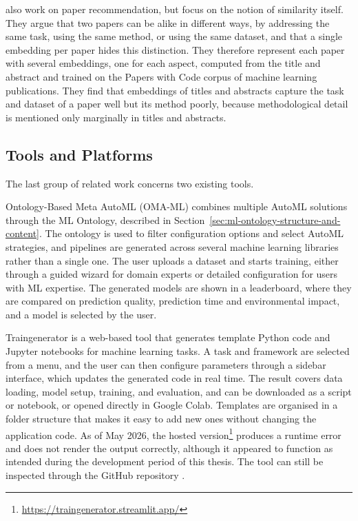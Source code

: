 \textcite{ostendorff2022_aspect_based_embeddings} also work on 
paper recommendation, but focus on the notion of similarity 
itself. They argue that two papers can be alike in different 
ways, by addressing the same task, using the same method, or 
using the same dataset, and that a single embedding per paper 
hides this distinction. They therefore represent each paper 
with several embeddings, one for each aspect, computed from 
the title and abstract and trained on the Papers with Code 
corpus of machine learning publications. They find that 
embeddings of titles and abstracts capture the task and dataset of a 
paper well but its method poorly, because methodological 
detail is mentioned only marginally in titles and abstracts.

\subsection{Tools and Platforms}
\label{sec:tools-and-platforms}

The last group of related work concerns two existing tools.

Ontology-Based Meta AutoML (OMA-ML) \parencite{zender2022ontology_based_meta_automl} combines
multiple AutoML solutions through the ML Ontology, described in
Section~\ref{sec:ml-ontology-structure-and-content}. The ontology
is used to filter configuration options and select AutoML
strategies, and pipelines are generated across several machine
learning libraries rather than a single one. The user uploads a
dataset and starts training, either through a guided wizard for
domain experts or detailed configuration for users with ML
expertise. The generated models are shown in a leaderboard, where
they are compared on prediction quality, prediction time and
environmental impact, and a model is selected by the user.

Traingenerator \parencite{rieke2021traingenerator} is a 
web-based tool that generates template Python code and Jupyter 
notebooks for machine learning tasks. A task and framework are 
selected from a menu, and the user can then configure 
parameters through a sidebar interface, which updates the 
generated code in real time. The result covers data loading, 
model setup, training, and evaluation, and can be downloaded 
as a script or notebook, or opened directly in Google Colab. 
Templates are organised in a folder structure that makes it 
easy to add new ones without changing the application code. 
As of May 2026, the hosted 
version\footnote{\url{https://traingenerator.streamlit.app/}} 
produces a runtime error and does not render the output 
correctly, although it appeared to function as intended during 
the development period of this thesis. The tool can still be 
inspected through the GitHub repository 
\parencite{rieke2021traingenerator}.


